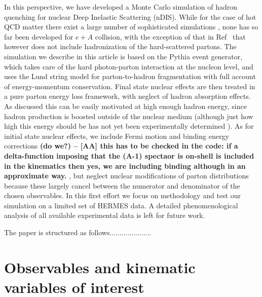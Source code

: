 In this perspective, we have developed a Monte Carlo simulation of hadron quenching for nuclear Deep Inelastic Scattering (nDIS). While for the case of hot QCD matter there exist a large number of sophisticated simulations \cite{some-review-with-hot-MCs,Buzzatti:2010ck}, none has so far been developed for $e+A$ collision, with the exception of that in Ref~\cite{Majumder:2009zu} that however does not include hadronization of the hard-scattered partons. The simulation we describe in this article is based on the Pythia event generator, which takes care of the hard photon-parton interaction at the nucleon level, and uses the Lund string model for parton-to-hadron fragmentation with full account of energy-momentum conservation. Final state nuclear effects are then treated in a pure parton energy loss framework, with neglect of hadron absorption effects. As discussed this can be easily motivated at high enough hadron energy, since hadron production is boosted outside of the nuclear medium (although just how high this energy should be has not yet been experimentally determined \cite{Accardi:2011mz}). As for initial state nuclear effects, we include Fermi motion and binding energy corrections {\bf (do we?) -- [AA] this has to be checked in the code: if a delta-function imposing that the (A-1) spectaor is on-shell is included in the kinematics then yes, we are including binding although in an approximate way.  }, but neglect nuclear modifications of parton distributions because these largely cancel between the numerator and denominator of the chosen observables. In this first effort we focus on methodology and test our simulation on a limited set of HERMES data. A detailed phenomenological analysis of all available experimental data is left for future work.


The paper is structured as follows.....................



\section{Observables and kinematic variables of interest}


